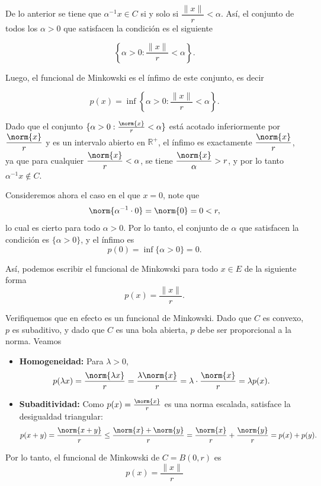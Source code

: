 \begin{solution}
De lo anterior se tiene que $\alpha^{-1} x \in C$ si y solo si $\dfrac{\|x\|}{r}<\alpha$. Así, el conjunto de todos los $\alpha > 0$ que satisfacen la condición es el siguiente

$$\left\{ \alpha > 0 : \frac{\|x\|}{r} < \alpha\right\}.$$

Luego, el funcional de Minkowski es el ínfimo de este conjunto, es decir

$$p(x) = \inf \left\{ \alpha > 0 : \frac{\|x\|}{r} < \alpha\right\}.$$

Dado que el conjunto $\{\alpha > 0 : \frac{\norm{x}}{r} <\alpha\}$ está acotado inferiormente por $\dfrac{\norm{x}}{r}$ y es un intervalo abierto en $\mathbb{R}^+$, el ínfimo es exactamente $\dfrac{\norm{x}}{r}$, ya que para cualquier $\dfrac{\norm{x}}{r}<\alpha$, se tiene $\dfrac{\norm{x}}{\alpha} > r$, y por lo tanto $\alpha^{-1} x \notin C$.

Consideremos ahora el caso en el que $x = 0$, note que
$$\norm{\alpha^{-1} \cdot 0} = \norm{0} = 0 < r,$$
lo cual es cierto para todo $\alpha > 0$. Por lo tanto, el conjunto de $\alpha$ que satisfacen la condición es $\{ \alpha > 0 \}$, y el ínfimo es
$$p(0) = \inf \{ \alpha> 0 \} = 0.$$

Así, podemos escribir el funcional de Minkowski para todo $x \in E$ de la siguiente forma
$$p(x) = \frac{\|x\|}{r}.$$

Verifiquemos que en efecto es un funcional de Minkowski. Dado que $C$ es convexo, $p$ es subaditivo, y dado que $C$ es una bola abierta, $p$ debe ser proporcional a la norma. Veamos
\begin{itemize}
    \item \textbf{Homogeneidad:} Para $\lambda > 0$,
    $$ p(\lambda x) = \frac{\norm{\lambda x}}{r} = \frac{\lambda \norm{x}}{r} = \lambda \cdot \frac{\norm{x}}{r} = \lambda p(x).$$

    \item \textbf{Subaditividad:} Como $p(x) = \frac{\norm{x}}{r}$ es una norma escalada, satisface la desigualdad triangular:
    $$p(x + y) = \frac{\norm{x + y}}{r} \leq \frac{\norm{x} + \norm{y}}{r} = \frac{\norm{x}}{r} + \frac{\norm{y}}{r} = p(x) + p(y).$$
\end{itemize}
Por lo tanto, el funcional de Minkowski de $C = B(0,r)$ es
$$ \boxed{p(x) = \frac{\|x\|}{r}}$$
\end{solution}



